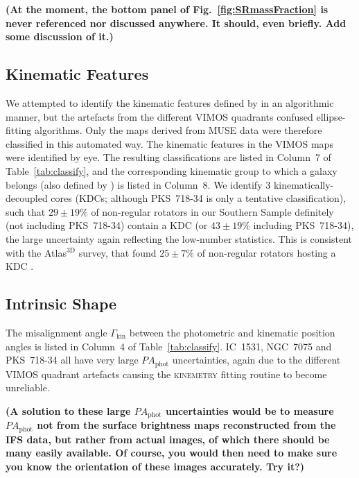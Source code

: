 \documentclass[a4paper,fleqn,usenatbib]{mnras}
\begin{document}
{\bf (At the moment, the bottom panel of Fig.~\ref{fig:SRmassFraction}
  is never referenced nor discussed anywhere. It should, even
  briefly. Add some discussion of it.)}

\subsection{Kinematic Features}
\label{subsec:kin_features}

We attempted to identify the kinematic features defined by
\citet{Krajnovic2011} in an algorithmic manner, but the artefacts from
the different VIMOS quadrants confused ellipse-fitting
algorithms. Only the maps derived from MUSE data were therefore
classified in this automated way. The kinematic features in the VIMOS
maps were identified by eye. The resulting classifications are listed
in Column~7 of Table~\ref{tab:classify}, and the corresponding
kinematic group to which a galaxy belongs (also defined by
\citealt{Krajnovic2011}) is listed in Column~8. We identify $3$
kinematically-decoupled cores (KDCs; although PKS~718-34 is only a
tentative classification), such that $29\pm19\%$ of non-regular
rotators in our Southern Sample definitely (not including PKS~718-34)
contain a KDC (or $43\pm19\%$ including PKS~718-34), the large
uncertainty again reflecting the low-number statistics. This is
consistent with the Atlas$^\text{3D}$ survey, that found $25\pm7\%$ of
non-regular rotators hosting a KDC \citep{Krajnovic2011}.

\subsection{Intrinsic Shape}
\label{subsec:int_shape}

The misalignment angle $\Gamma_\text{kin}$ between the photometric and
kinematic position angles is listed in Column~4 of
Table~\ref{tab:classify}. IC~1531, NGC~7075 and PKS~718-34 all have
very large $PA_\text{phot}$ uncertainties, again due to the different
VIMOS quadrant artefacts causing the \textsc{kinemetry} fitting
routine to become unreliable.

{\bf (A solution to these large $PA_\text{phot}$ uncertainties would
  be to measure $PA_\text{phot}$ not from the surface brightness maps
  reconstructed from the IFS data, but rather from actual images, of
  which there should be many easily available. Of course, you would
  then need to make sure you know the orientation of these images
  accurately. Try it?)}
\end{document}

